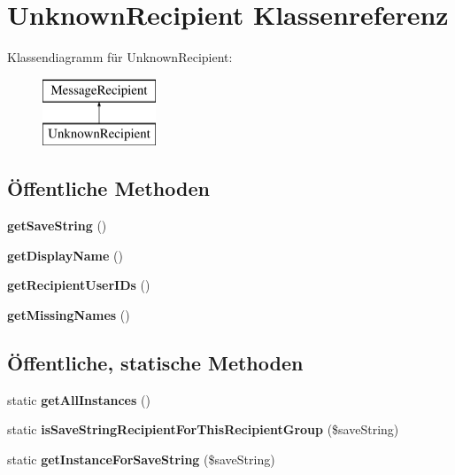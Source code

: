 \hypertarget{class_unknown_recipient}{}\section{Unknown\+Recipient Klassenreferenz}
\label{class_unknown_recipient}
Klassendiagramm für Unknown\+Recipient\+:\begin{figure}[H]
\begin{center}
\leavevmode
\includegraphics[height=2.000000cm]{class_unknown_recipient}
\end{center}
\end{figure}
\subsection*{Öffentliche Methoden}
\begin{DoxyCompactItemize}
\item 
\mbox{\label{class_unknown_recipient_a6f7b5fbf8454ba6718890ee84bc55db1}} 
{\bfseries get\+Save\+String} ()
\item 
\mbox{\label{class_unknown_recipient_a73191809d09cf632bbdc5ba994a12f09}} 
{\bfseries get\+Display\+Name} ()
\item 
\mbox{\label{class_unknown_recipient_a34a2f51706392f9b19868541d7504f8c}} 
{\bfseries get\+Recipient\+User\+I\+Ds} ()
\item 
\mbox{\label{class_unknown_recipient_a3ea012b937ccaa59f0ccbe016d872936}} 
{\bfseries get\+Missing\+Names} ()
\end{DoxyCompactItemize}
\subsection*{Öffentliche, statische Methoden}
\begin{DoxyCompactItemize}
\item 
\mbox{\label{class_unknown_recipient_aa744a071bb1bc19bf4ffc72736638123}} 
static {\bfseries get\+All\+Instances} ()
\item 
\mbox{\label{class_unknown_recipient_a586a42a83894ea5c4a4f3cba8c12e173}} 
static {\bfseries is\+Save\+String\+Recipient\+For\+This\+Recipient\+Group} (\$save\+String)
\item 
\mbox{\label{class_unknown_recipient_a2c8cb1761229e244ba241b9127d389ed}} 
static {\bfseries get\+Instance\+For\+Save\+String} (\$save\+String)
\end{DoxyCompactItemize}
